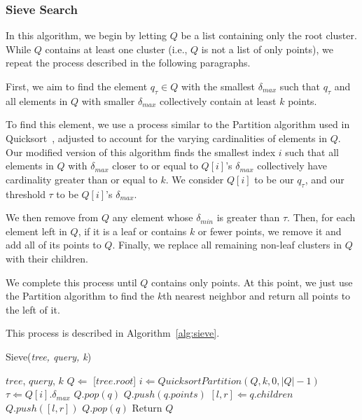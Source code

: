 \subsubsection{Sieve Search}
\label{subsubsec:methods:knn-search:sieve}
In this algorithm, we begin by letting $Q$ be a list containing only the root cluster. 
While $Q$ contains at least one cluster (i.e., $Q$ is not a list of only points), we repeat the process described in 
the following paragraphs. 

First, 
we aim to find the element $q_{\tau} \in Q$ with the smallest $\delta_{max}$ such that 
$q_{\tau}$ and all elements in $Q$ with smaller $\delta_{max}$ collectively contain at least $k$ points. 

To find this element, 
we use a process similar to the Partition algorithm used in Quicksort~\cite{10.1093/comjnl/5.1.10}, adjusted to account for the varying cardinalities of elements in $Q$. 
Our modified version of this algorithm finds the smallest index $i$ such 
that all elements in $Q$ with $\delta_{max}$ closer to or equal to $Q[i]$'s $\delta_{max}$ collectively have cardinality greater
than or equal to $k$. We consider $Q[i]$ to be our $q_{\tau}$, and our threshold 
$\tau$ to be $Q[i]$'s $\delta_{max}$.

We then remove from $Q$ any element whose $\delta_{min}$ is greater than $\tau$. Then, for each element left 
in $Q$, if it is a leaf or contains $k$ or fewer points, we remove it and add all of its points to $Q$. Finally, we
replace all remaining non-leaf clusters in $Q$ with their children. 

We complete this process until $Q$ contains only points. At this point, we 
just use the Partition algorithm to find the $k$th 
nearest neighbor and return all points to the left of it. 

This process is described in Algorithm~\ref{alg:sieve}. 

\begin{algorithm} %
    \caption{Sieve(\emph{tree, query, k})} %
    \label{alg:sieve} %
    \begin{algorithmic} %
        \REQUIRE $tree$, $query$, $k$
        \STATE $Q \Leftarrow$ [$tree.root$]
            \STATE $i \Leftarrow QuicksortPartition(Q, k, 0, |Q| - 1)$
            \STATE $\tau \Leftarrow Q[i].\delta_{max}$
                    \STATE $Q.pop(q)$
                \ENDIF
            \ENDFOR
                    \STATE $Q.push(q.points)$
                \ELSE
                    \STATE $[l, r] \Leftarrow q.children$
                    \STATE $Q.push([l, r])$   
                \ENDIF
                \STATE $Q.pop(q)$
            \ENDFOR 
        \ENDWHILE
        \STATE Return $Q$
    \end{algorithmic}
    \end{algorithm}

